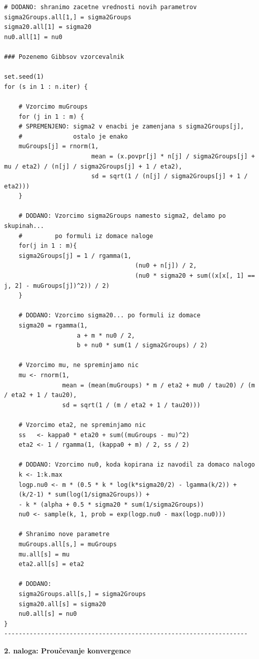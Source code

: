 \documentclass[a4paper,11pt]{article}
\begin{document}
\begin{lstlisting}
# DODANO: shranimo zacetne vrednosti novih parametrov
sigma2Groups.all[1,] = sigma2Groups
sigma20.all[1] = sigma20 
nu0.all[1] = nu0

### Pozenemo Gibbsov vzorcevalnik

set.seed(1)
for (s in 1 : n.iter) {
    
    # Vzorcimo muGroups
    for (j in 1 : m) {
    # SPREMENJENO: sigma2 v enacbi je zamenjana s sigma2Groups[j], 
    #              ostalo je enako
    muGroups[j] = rnorm(1,
                        mean = (x.povpr[j] * n[j] / sigma2Groups[j] + mu / eta2) / (n[j] / sigma2Groups[j] + 1 / eta2),
                        sd = sqrt(1 / (n[j] / sigma2Groups[j] + 1 / eta2)))
    }
    
    # DODANO: Vzorcimo sigma2Groups namesto sigma2, delamo po skupinah... 
    #         po formuli iz domace naloge
    for(j in 1 : m){
    sigma2Groups[j] = 1 / rgamma(1,
                                    (nu0 + n[j]) / 2,
                                    (nu0 * sigma20 + sum((x[x[, 1] == j, 2] - muGroups[j])^2)) / 2)
    }
    
    # DODANO: Vzorcimo sigma20... po formuli iz domace
    sigma20 = rgamma(1,
                    a + m * nu0 / 2,
                    b + nu0 * sum(1 / sigma2Groups) / 2)
    
    # Vzorcimo mu, ne spreminjamo nic
    mu <- rnorm(1,
                mean = (mean(muGroups) * m / eta2 + mu0 / tau20) / (m / eta2 + 1 / tau20),
                sd = sqrt(1 / (m / eta2 + 1 / tau20)))
    
    # Vzorcimo eta2, ne spreminjamo nic
    ss   <- kappa0 * eta20 + sum((muGroups - mu)^2)
    eta2 <- 1 / rgamma(1, (kappa0 + m) / 2, ss / 2)
    
    # DODANO: Vzorcimo nu0, koda kopirana iz navodil za domaco nalogo
    k <- 1:k.max
    logp.nu0 <- m * (0.5 * k * log(k*sigma20/2) - lgamma(k/2)) +
    (k/2-1) * sum(log(1/sigma2Groups)) +
    - k * (alpha + 0.5 * sigma20 * sum(1/sigma2Groups))
    nu0 <- sample(k, 1, prob = exp(logp.nu0 - max(logp.nu0)))
    
    # Shranimo nove parametre
    muGroups.all[s,] = muGroups 
    mu.all[s] = mu
    eta2.all[s] = eta2
    
    # DODANO:
    sigma2Groups.all[s,] = sigma2Groups
    sigma20.all[s] = sigma20 
    nu0.all[s] = nu0
}
-------------------------------------------------------------------
\end{lstlisting}


\noindent
\textbf{2. naloga: Proučevanje konvergence}
\end{document}
